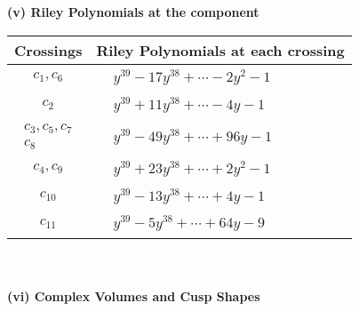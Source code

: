 \documentclass[1p]{elsarticle_modified}
\theoremstyle{definition}
\begin{document}
\newpage\renewcommand{\arraystretch}{1}
\flushleft \textbf{(v) Riley Polynomials at the component}\newline \\
\begin{tabular}{m{50pt}|m{274pt}}
Crossings & \hspace{64pt}Riley Polynomials at each crossing \\
\hline $$\begin{aligned}c_{1},c_{6}\end{aligned}$$&$\begin{aligned}
&y^{39}-17 y^{38}+\cdots-2 y^2-1
\end{aligned}$\\
\hline $$\begin{aligned}c_{2}\end{aligned}$$&$\begin{aligned}
&y^{39}+11 y^{38}+\cdots-4 y-1
\end{aligned}$\\
\hline $$\begin{aligned}c_{3},c_{5},c_{7}\\c_{8}\end{aligned}$$&$\begin{aligned}
&y^{39}-49 y^{38}+\cdots+96 y-1
\end{aligned}$\\
\hline $$\begin{aligned}c_{4},c_{9}\end{aligned}$$&$\begin{aligned}
&y^{39}+23 y^{38}+\cdots+2 y^2-1
\end{aligned}$\\
\hline $$\begin{aligned}c_{10}\end{aligned}$$&$\begin{aligned}
&y^{39}-13 y^{38}+\cdots+4 y-1
\end{aligned}$\\
\hline $$\begin{aligned}c_{11}\end{aligned}$$&$\begin{aligned}
&y^{39}-5 y^{38}+\cdots+64 y-9
\end{aligned}$\\
\hline
\end{tabular}\\~\\
\newpage\flushleft \textbf{(vi) Complex Volumes and Cusp Shapes}
\end{document}
